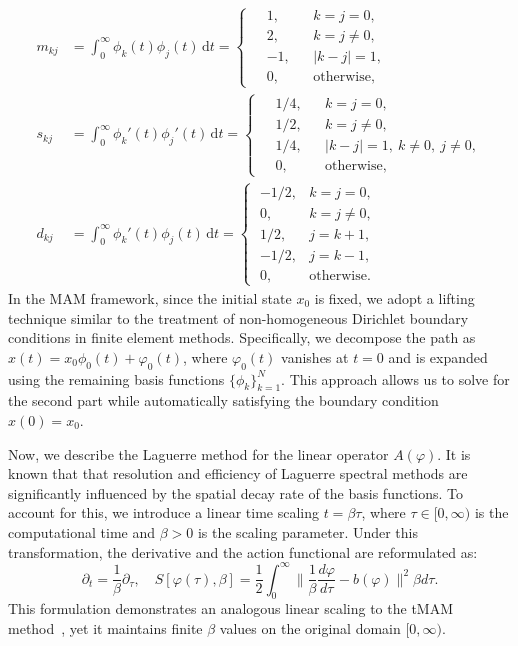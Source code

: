 \documentclass[a4paper,fleqn, 12pt]{cas-sc}
\newcommand{\diff}{\,\mathrm{d}}
\numberwithin{table}{section}
\begin{document}
\begin{align*}
m_{kj} &= \int_0^{\infty} \phi_k(t)\phi_j(t)\diff t
= \left\{\;
\begin{aligned}
&1,  && k=j=0,\\
&2,  && k=j\neq 0,\\
&-1, && |k-j|=1,\\
&0,  && \text{otherwise},
\end{aligned}
\right. \\[1mm]
s_{kj} &= \int_0^{\infty} \phi_k'(t)\phi_j'(t)\diff t
= \left\{\;
\begin{aligned}
&1/4, && k=j=0,\\
&1/2, && k=j\neq 0,\\
&1/4, && |k-j|=1,\ k\neq0,\ j\neq0,\\
&0,        && \text{otherwise},
\end{aligned}
\right. \\[1mm]
d_{kj} &= \int_0^{\infty} \phi_k'(t)\phi_j(t)\diff t
= \left\{\;
\begin{array}{ll}
-1/2, & k=j=0,\\
0,    & k=j\neq 0,\\
1/2,  & j=k+1,\\
-1/2, & j=k-1,\\
0,    & \text{otherwise}.     
\end{array}
\right.
\end{align*}
In the MAM framework, since the initial state $x_0$ is fixed, we adopt a lifting technique similar to the treatment of non-homogeneous Dirichlet boundary conditions in finite element methods. Specifically, we decompose the path as $x(t) = x_0 \phi_0(t) + \varphi_0(t)$, where $\varphi_0(t)$ vanishes at $t=0$ and is expanded using the remaining basis functions $\{\phi_k\}_{k=1}^N$. This approach allows us to solve for the second part while automatically satisfying the boundary condition $x(0)=x_0$.

Now, we describe the Laguerre method for the linear operator $A (\varphi)$. 
It is known that that resolution and efficiency of Laguerre spectral methods are significantly influenced by the spatial decay rate of the basis functions. To account for this, we introduce a linear time scaling $t = \beta \tau$, where $\tau \in [0, \infty)$ is the computational time and $\beta > 0$ is the scaling parameter. Under this transformation, the derivative and the action functional are reformulated as:
\begin{equation}\label{eq:scaledAction}
    \partial_t = \frac{1}{\beta} \partial_\tau, \quad S[\varphi(\tau), \beta] = \frac{1}{2} \int_0^{\infty} \bigl\| \frac{1}{\beta} \frac{d\varphi}{d\tau} - b(\varphi) \bigr\|^2 \beta d\tau.
\end{equation}
This formulation demonstrates an analogous linear scaling to the tMAM method~\cite{wan_minimum_2015}, yet it maintains finite $\beta$ values on the original domain $[0, \infty)$. 
\end{document}
